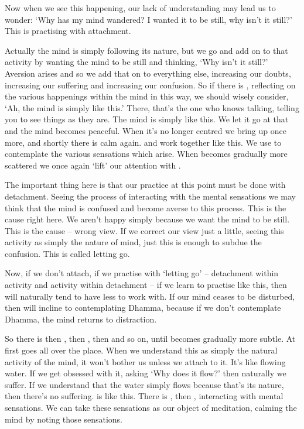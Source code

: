 Now when we see this happening, our lack of understanding may lead us to wonder: `Why has my mind wandered? I wanted it to be still, why isn't it still?' This is practising with attachment. 

Actually the mind is simply following its nature, but we go and add on to that activity by wanting the mind to be still and thinking, `Why isn't it still?' Aversion arises and so we add that on to everything else, increasing our doubts, increasing our suffering and increasing our confusion. So if there is , reflecting on the various happenings within the mind in this way, we should wisely consider, `Ah, the mind is simply like this.' There, that's the one who knows talking, telling you to see things as they are. The mind is simply like this. We let it go at that and the mind becomes peaceful. When it's no longer centred we bring up  once more, and shortly there is calm again.  and  work together like this. We use  to contemplate the various sensations which arise. When  becomes gradually more scattered we once again `lift' our attention with . 

The important thing here is that our practice at this point must be done with detachment. Seeing the process of  interacting with the mental sensations we may think that the mind is confused and become averse to this process. This is the cause right here. We aren't happy simply because we want the mind to be still. This is the cause -- wrong view. If we correct our view just a little, seeing this activity as simply the nature of mind, just this is enough to subdue the confusion. This is called letting go. 

Now, if we don't attach, if we practise with `letting go' -- detachment within activity and activity within detachment -- if we learn to practise like this, then  will naturally tend to have less to work with. If our mind ceases to be disturbed, then  will incline to contemplating Dhamma, because if we don't contemplate Dhamma, the mind returns to distraction. 

So there is  then ,  then ,  then  and so on, until  becomes gradually more subtle. At first  goes all over the place. When we understand this as simply the natural activity of the mind, it won't bother us unless we attach to it. It's like flowing water. If we get obsessed with it, asking `Why does it flow?' then naturally we suffer. If we understand that the water simply flows because that's its nature, then there's no suffering.  is like this. There is , then , interacting with mental sensations. We can take these sensations as our object of meditation, calming the mind by noting those sensations. 


